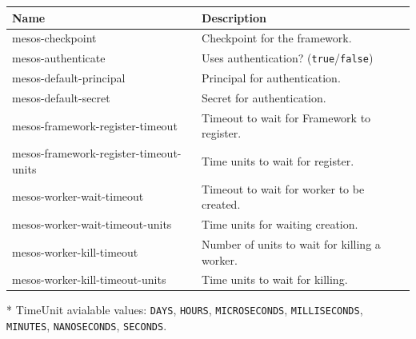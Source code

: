 \begin{table}[h]
\def\arraystretch{1.2}
\centering
\begin{tabularx}{\linewidth}{|l|X|} \hline
	\textbf{Name} &\textbf{Description} \\ \hline
	mesos-checkpoint  & Checkpoint for the framework.\\ \hline
	mesos-authenticate & Uses authentication? (\texttt{true}/\texttt{false}) \\ \hline
	mesos-default-principal & Principal for authentication.\\ \hline
	mesos-default-secret  & Secret for authentication.\\ \hline
	mesos-framework-register-timeout & Timeout to wait for Framework to register.\\ \hline
	mesos-framework-register-timeout-units&  Time units to wait for register.\\ \hline
	mesos-worker-wait-timeout & Timeout to wait for worker to be created.\\ \hline
	mesos-worker-wait-timeout-units  & Time units for waiting creation. \\ \hline
	mesos-worker-kill-timeout  & Number of units to wait for killing a worker. \\ \hline
	mesos-worker-kill-timeout-units  & Time units to wait for killing.\\ \hline
\end{tabularx}
\end{table}
\noindent
* TimeUnit avialable values: \texttt{DAYS}, \texttt{HOURS}, \texttt{MICROSECONDS}, \texttt{MILLISECONDS}, \texttt{MINUTES}, \texttt{NANOSECONDS}, \texttt{SECONDS}.
